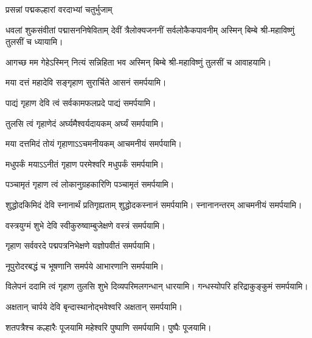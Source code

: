 \begin{center}

{प्रसन्नां पद्मकल्हारां वरदाभ्यां चतुर्भुजाम्}

{धवलां शुकसंवीतां पद्मासननिषेविताम्}
{देवीं त्रैलोक्यजननीं सर्वलोकैकपावनीम्}
अस्मिन् बिम्बे श्री-महाविष्णुं तुलसीं च ध्यायामि।

{आगच्छ मम गेहेऽस्मिन् नित्यं सन्निहिता भव}
अस्मिन् बिम्बे श्री-महाविष्णुं तुलसीं च आवाहयामि।
\medskip

\medskip
{}
{मया दत्तं महादेवि सङ्गृहाण सुरार्चिते}
 आसनं समर्पयामि।\medskip

{पाद्यं गृहाण देवि त्वं सर्वकामफलप्रदे}
 पाद्यं समर्पयामि।\medskip

{तुलसि त्वं गृहाणेदं अर्घ्यमैश्वर्यदायकम्}
 अर्घ्यं समर्पयामि।\medskip

{मया दत्तमिदं तोयं गृहाणाऽऽचमनीयकम्}
 आचमनीयं समर्पयामि।\medskip

{मधुपर्कं मयाऽऽनीतं गृहाण परमेश्वरि}
मधुपर्कं समर्पयामि।\medskip

{पञ्चामृतं गृहाण त्वं लोकानुग्रहकारिणि}
पञ्चामृतं समर्पयामि।\medskip


{शुद्धोदकिमिदं देवि स्नानार्थं प्रतिगृह्यताम्}
 शुद्धोदकस्नानं समर्पयामि। स्नानानन्तरम् आचमनीयं समर्पयामि।\medskip

 {वस्त्रयुग्मं शुभे देवि स्वीकुरुष्वाम्बुजेक्षणे}
 वस्त्रं समर्पयामि।\medskip

{गृहाण सर्ववरदे पद्मपत्रनिभेक्षणे}
 यज्ञोपवीतं समर्पयामि।\medskip

{नूपुरोदरबद्धं च भूषणानि समर्पये}
आभारणानि समर्पयामि।\medskip
 
{विलेपनं ददामि त्वं गृहाण तुलसि शुभे}
 दिव्यपरिमलगन्धान् धारयामि। गन्धस्योपरि हरिद्राकुङ्कुमं समर्पयामि। 

{अक्षतान् चार्पये देवि बृन्दास्थानोद्भवेश्वरि}
अक्षतान् समर्पयामि।\medskip

{शतपत्रैश्च कल्हारैः पूजयामि महेश्वरि}
 पुष्पाणि समर्पयामि।  पुष्पैः पूजयामि।
\end{center}

